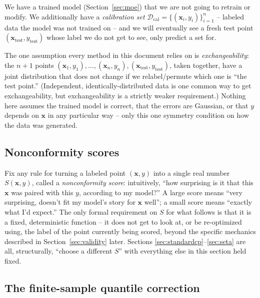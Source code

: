 \documentclass[11pt]{article}
\begin{document}
We have a trained model (Section~\ref{sec:moe}) that we are not going to retrain or modify. We
additionally have a \emph{calibration set} $\mathcal D_{\mathrm{cal}} = \{(\bm x_i, y_i)\}_{i=1}^n$
-- labeled data the model was not trained on -- and we will eventually see a fresh test point
$(\bm x_{\mathrm{test}}, y_{\mathrm{test}})$ whose label we do not get to see, only predict a set
for.

The one assumption every method in this document relies on is \emph{exchangeability}: the $n+1$
points $(\bm x_1,y_1),\dots,(\bm x_n,y_n),(\bm x_{\mathrm{test}},y_{\mathrm{test}})$, taken
together, have a joint distribution that does not change if we relabel/permute which one is
``the test point.'' (Independent, identically-distributed data is one common way to get
exchangeability, but exchangeability is a strictly weaker requirement.) Nothing here assumes the
trained model is correct, that the errors are Gaussian, or that $y$ depends on $\bm x$ in any
particular way -- only this one symmetry condition on how the data was generated.

\subsection{Nonconformity scores}

Fix any rule for turning a labeled point $(\bm x, y)$ into a single real number $S(\bm x, y)$,
called a \emph{nonconformity score}: intuitively, ``how surprising is it that this $\bm x$ was
paired with this $y$, according to my model?'' A large score means ``very surprising, doesn't fit
my model's story for $\bm x$ well''; a small score means ``exactly what I'd expect.'' The only
formal requirement on $S$ for what follows is that it is a fixed, deterministic function -- it
does not get to look at, or be re-optimized using, the label of the point currently being scored,
beyond the specific mechanics described in Section~\ref{sec:validity} later. Sections
\ref{sec:standardcp}--\ref{sec:seta} are all, structurally, ``choose a different $S$'' with
everything else in this section held fixed.

\subsection{The finite-sample quantile correction}
\label{sec:quantile}
\end{document}
